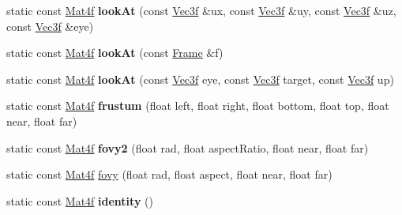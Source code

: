 \begin{DoxyCompactItemize}
\item 
\hypertarget{structvsr_1_1_x_mat_a75b1e6cd4df8391bf778d93117703af5}{static const \hyperlink{classvsr_1_1_mat4}{Mat4f} {\bfseries look\-At} (const \hyperlink{classvsr_1_1_vec3}{Vec3f} \&ux, const \hyperlink{classvsr_1_1_vec3}{Vec3f} \&uy, const \hyperlink{classvsr_1_1_vec3}{Vec3f} \&uz, const \hyperlink{classvsr_1_1_vec3}{Vec3f} \&eye)}\label{structvsr_1_1_x_mat_a75b1e6cd4df8391bf778d93117703af5}

\item 
\hypertarget{structvsr_1_1_x_mat_a259b8f64ba5f33fdca8d6e322060cf4a}{static const \hyperlink{classvsr_1_1_mat4}{Mat4f} {\bfseries look\-At} (const \hyperlink{classvsr_1_1_frame}{Frame} \&f)}\label{structvsr_1_1_x_mat_a259b8f64ba5f33fdca8d6e322060cf4a}

\item 
\hypertarget{structvsr_1_1_x_mat_a4791b66c09b46c62f07b4f7f66acb69d}{static const \hyperlink{classvsr_1_1_mat4}{Mat4f} {\bfseries look\-At} (const \hyperlink{classvsr_1_1_vec3}{Vec3f} eye, const \hyperlink{classvsr_1_1_vec3}{Vec3f} target, const \hyperlink{classvsr_1_1_vec3}{Vec3f} up)}\label{structvsr_1_1_x_mat_a4791b66c09b46c62f07b4f7f66acb69d}

\item 
\hypertarget{structvsr_1_1_x_mat_a61f9cc9070549394e9b2d0ed206f09c1}{static const \hyperlink{classvsr_1_1_mat4}{Mat4f} {\bfseries frustum} (float left, float right, float bottom, float top, float near, float far)}\label{structvsr_1_1_x_mat_a61f9cc9070549394e9b2d0ed206f09c1}

\item 
\hypertarget{structvsr_1_1_x_mat_a35416568da1041da0eefa1d73c8b6547}{static const \hyperlink{classvsr_1_1_mat4}{Mat4f} {\bfseries fovy2} (float rad, float aspect\-Ratio, float near, float far)}\label{structvsr_1_1_x_mat_a35416568da1041da0eefa1d73c8b6547}

\item 
static const \hyperlink{classvsr_1_1_mat4}{Mat4f} \hyperlink{structvsr_1_1_x_mat_adc298d33b180a119f5f4497195394423}{fovy} (float rad, float aspect, float near, float far)
\item 
\hypertarget{structvsr_1_1_x_mat_ae719559b6ab8d01f071afea818456869}{static const \hyperlink{classvsr_1_1_mat4}{Mat4f} {\bfseries identity} ()}\label{structvsr_1_1_x_mat_ae719559b6ab8d01f071afea818456869}

\end{DoxyCompactItemize}


